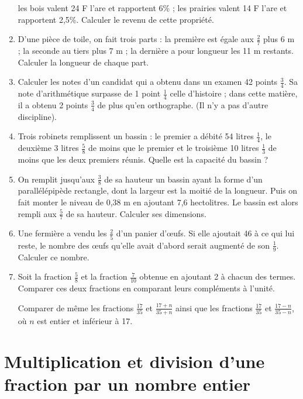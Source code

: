 \documentclass[12 pt]{report}
\theoremstyle{plain}
\newcounter{n}
\begin{document}
\begin{enumerate}
les bois valent 24 F l'are et rapportent 6\% ; 
les prairies valent 14 F l'are et rapportent 2,5\%. 
Calculer le revenu de cette propriété.
\item D'une pièce de toile, on fait trois parts : la première est égale aux $\frac27$ plus 6 m ; la seconde
au tiers plus 7 m ; la dernière a pour longueur les 11 m restants. Calculer la longueur de chaque part. 
\item Calculer les notes d'un candidat qui a obtenu 
dans un examen 42 points $\frac34$. Sa note d'arithmétique surpasse de 1 point $\frac14$ celle d'histoire ; dans cette matière, il a obtenu 2 points $\frac34$ de plus qu'en orthographe. (Il n'y a pas d'autre discipline). 
\item Trois robinets remplissent un bassin : le premier a débité 54 litres $\frac14$, le deuxième 3 litres $\frac58$ de moins que le premier et le troisième 10 litres $\frac13$ de moins que les deux premiers réunis. Quelle est la capacité du bassin ? 
\item On remplit jusqu'aux $\frac38$ de sa hauteur un bassin ayant la forme d'un parallélépipède rectangle, dont la largeur est la moitié de la longueur. Puis on fait monter le niveau de 0,38 m en ajoutant 7,6 hectolitres. Le bassin est alors rempli aux $\frac57$ de sa hauteur. Calculer ses dimensions. 
\item Une fermière a vendu les $\frac25$ d'un panier d'œufs. Si elle ajoutait 46 à ce qui lui reste, le nombre des œufs qu'elle avait d'abord serait augmenté de son $\frac19$. Calculer ce nombre.
\item Soit la fraction $\frac58$ et la fraction $\frac7{10}$ obtenue en ajoutant 2 à chacun des termes. Comparer ces deux fractions en comparant leurs 
compléments à l'unité. 

Comparer de même les fractions $\frac{17}{35}$ et $\frac{17+n}{35+n}$ ainsi que les fractions $\frac{17}{35}$ et $\frac{17-n}{35-n}$, où $n$ est entier et inférieur à 17. 

\end{enumerate}

\chapter{Multiplication et division d'une fraction par un nombre entier}
 
\end{document}

